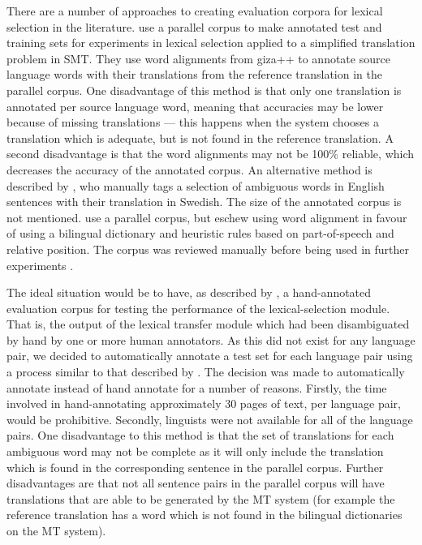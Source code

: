 \documentclass[11pt]{article}
\begin{document}
There are a number of approaches to creating evaluation corpora for
lexical selection in the literature. \cite{vickrey05} use a parallel
corpus to make annotated test and training sets for experiments in
lexical selection applied to a simplified translation problem in
SMT. They use word alignments from {\sc giza++} \citep{och03a} to
annotate source language words with their translations from the
reference translation in the parallel corpus. One disadvantage of this
method is that only one translation is annotated per source language
word, meaning that accuracies may be lower because of missing
translations --- this happens when the system chooses a translation
which is adequate, but is not found in the reference translation. A
second disadvantage is that the word alignments may not be 100\%
reliable, which decreases the accuracy of the annotated corpus. An
alternative method is described by \cite{zinovjeva2000}, who manually
tags a selection of ambiguous words in English sentences with their
translation in Swedish. The size of the annotated corpus is not
mentioned. \cite{specia2005a} use a parallel corpus, but eschew using
word alignment in favour of using a bilingual dictionary and heuristic
rules based on part-of-speech and relative position. The corpus was
reviewed manually before being used in further experiments
\citep{specia2005}.


The ideal situation would be to have, as described by
\cite{zinovjeva2000}, a hand-annotated evaluation corpus for testing
the performance of the lexical-selection module. That is, the output
of the lexical transfer module which had been disambiguated by hand by
one or more human annotators. As this did not exist for any language
pair, we decided to automatically annotate a test set for each
language pair using a process similar to that described by
\cite{vickrey05}. The decision was made to automatically annotate
instead of hand annotate for a number of reasons. Firstly, the time
involved in hand-annotating approximately 30 pages of text, per
language pair, would be prohibitive. Secondly, linguists were not
available for all of the language pairs. One disadvantage
to this method is that the set of
translations for each ambiguous word may not be complete as it will
only include the translation which is found in the corresponding
sentence in the parallel corpus. Further disadvantages are that 
not all sentence pairs in the parallel corpus will have translations
that are able to be generated by the MT system (for
example the reference translation has a word which is not found in
the bilingual dictionaries on the MT system).
\end{document}

